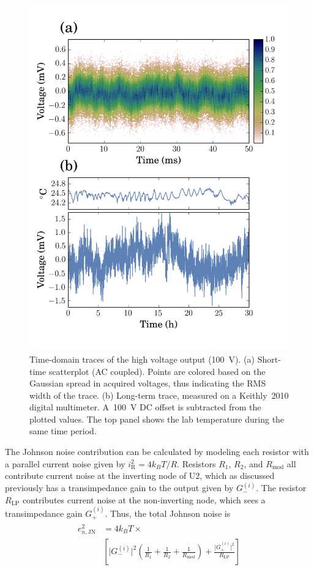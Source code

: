 \documentclass[aip,rsi,reprint]{revtex4-1} %
\begin{document}
 

\begin{figure}[b]
\includegraphics[width=\columnwidth]{fig/TimeDomain.png}
\caption{Time-domain traces of the high voltage output (\SI{100}{\volt}). (a) Short-time scatterplot  (AC coupled). Points are colored based on the Gaussian spread in acquired voltages, thus indicating the RMS width of the trace. (b) Long-term trace, measured on a Keithly~2010 digital multimeter. A~\SI{100}{\volt} DC offset is subtracted from the plotted values. The top panel shows the lab temperature during the same time period.\label{Fig:TimeDomain}}
\end{figure}

The Johnson noise contribution can be calculated by modeling each resistor with a parallel current noise given by $i_\text{R}^2 = 4k_B T/R$.
Resistors $R_1$, $R_2$, and $R_\text{mod}$ all contribute current noise at the inverting node of U2, which as discussed previously has a transimpedance gain to the output given by $G_{-}^{(i)}$.
The resistor $R_\text{LP}$ contributes current noise at the non-inverting node, which sees a transimpedance gain $G_{+}^{(i)}$.
Thus, the total Johnson noise is
\begin{align}
\begin{split}
e^2_{n,\text{JN}} &= 4 k_B T \times \\
&\left[ \big|G_{-}^{(i)}\big|^2 \left(\frac{1}{R_1} + \frac{1}{R_2} + \frac{1}{R_\text{mod}} \right) + 
\frac{\big|G_{+}^{(i)}\big|^2}{R_\text{LP}} \right]
\end{split}
\end{align}
\end{document}
